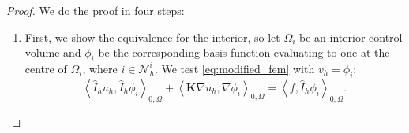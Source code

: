 \documentclass[../Main/main.tex]{subfiles}
\begin{document}
	\begin{proof}
		We do the proof in four steps:
		\begin{enumerate}
			\item First, we show the equivalence for the interior, so
			let $\Omega_i$ be an interior control volume and $\phi_i$ be the corresponding basis function evaluating to one at the centre of $\Omega_i$, where $i \in \mathcal{N}_h^i$.
			We test \eqref{eq:modified_fem} with $v_h=\phi_i$:
			\begin{equation}\label{eq:modified fem interior}
				\left \langle \hat{I}_h u_h,\hat{I}_h \phi_i \right \rangle_{0,\Omega} +   \left \langle\bm{K} \nabla u_h,\nabla \phi_i \right \rangle_{0,\Omega} = \left \langle f,\hat{I}_h \phi_i \right \rangle_{0,\Omega} .
			\end{equation}
			

\end{enumerate}
\end{proof}
\end{document}
